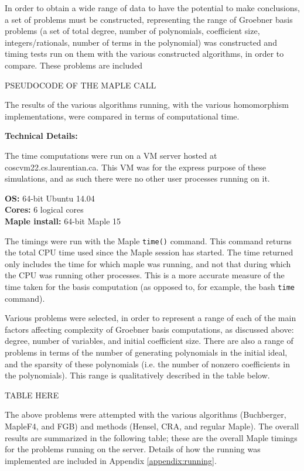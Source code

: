 \documentclass[letterpaper,12pt,titlepage,oneside,final]{book}
\begin{document}
In order to obtain a wide range of data to have the potential to make conclusions, a set of problems must be constructed, representing the range of Groebner basis problems (a set of total degree, number of polynomials, coefficient size, integers/rationals, number of terms in the polynomial) was constructed and timing tests run on them with the various constructed algorithms, in order to compare.  These problems are included 

PSEUDOCODE OF THE MAPLE CALL

The results of the various algorithms running, with the various homomorphism implementations, were compared in terms of computational time.  

\noindent \textbf{Technical Details:}

The time computations were run on a VM server hosted at coscvm22.cs.laurentian.ca.  This VM was for the express purpose of these simulations, and as such there were no other user processes running on it.

\noindent \textbf{OS:} 64-bit Ubuntu 14.04\\
\textbf{Cores:} 6 logical cores\\
\textbf{Maple install:} 64-bit Maple 15

The timings were run with the Maple \texttt{time()} command.  This command returns the total CPU time used since the Maple session has started.  The time returned only includes the time for which maple was running, and not that during which the CPU was running other processes.  This is a more accurate measure of the time taken for the basis computation (as opposed to, for example, the bash \texttt{time} command).

Various problems were selected, in order to represent a range of each of the main factors affecting complexity of Groebner basis computations, as discussed above: degree, number of variables, and initial coefficient size.  There are also a range of problems in terms of the number of generating polynomials in the initial ideal, and the sparsity of these polynomials (i.e. the number of nonzero coefficients in the polynomials).  This range is qualitatively described in the table below.

TABLE HERE

The above problems were attempted with the various algorithms (Buchberger, MapleF4, and FGB) and methods (Hensel, CRA, and regular Maple).  The overall results are summarized in the following table; these are the overall Maple timings for the problems running on the server.  Details of how the running was implemented are included in Appendix \ref{appendix:running}.
\end{document}
